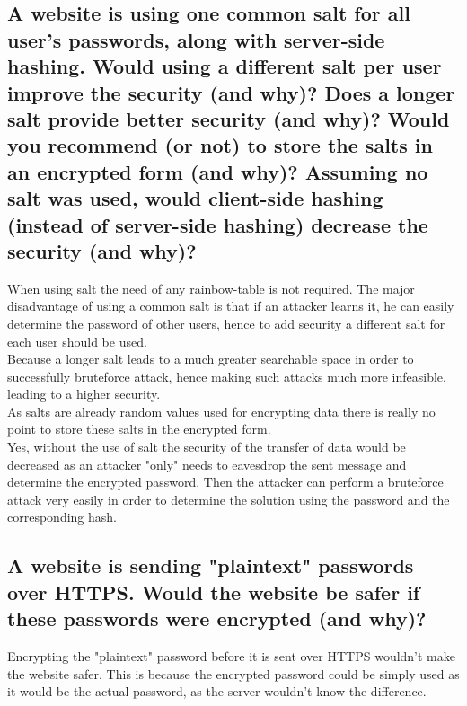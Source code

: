 \documentclass{report}
\begin{document}
		\subsection{A website is using one common salt for all user’s passwords, along with server-side hashing. Would using a different salt per user improve the security (and why)? Does a longer salt provide better security (and why)? Would you recommend (or not) to store the salts in an encrypted form (and why)? Assuming no salt was used, would client-side hashing (instead of server-side hashing) decrease the security (and why)?}
		\startsubsection
			When using salt the need of any rainbow-table is not required. The major disadvantage of using a common salt is that if an attacker learns it, he can easily determine the password of other users, hence to add security a different salt for each user should be used. \\
			Because a longer salt leads to a much greater searchable space in order to successfully bruteforce attack, hence making such attacks much more infeasible, leading to a higher security. \\
			As salts are already random values used for encrypting data there is really no point to store these salts in the encrypted form. \\
			Yes, without the use of salt the security of the transfer of data would be decreased as an attacker "only" needs to eavesdrop the sent message and determine the encrypted password. Then the attacker can perform a bruteforce attack very easily in order to determine the solution using the password and the corresponding hash.
		\closesection
		
		\subsection{A website is sending "plaintext" passwords over HTTPS. Would the website be safer if these passwords were encrypted (and why)?}
		\startsubsection
			Encrypting the "plaintext" password before it is sent over HTTPS wouldn't make the website safer. This is because the encrypted password could be simply used as it would be the actual password, as the server wouldn't know the difference.
		\closesection
	\closesection
\end{document}
